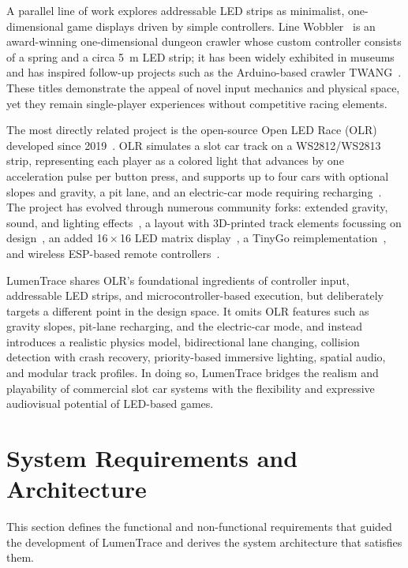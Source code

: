 \documentclass[10pt,journal,final,a4paper]{IEEEtran}
\begin{document}
A parallel line of work explores addressable LED strips as minimalist, one-dimensional game displays driven by simple controllers. Line Wobbler~\cite{baumgarten:2023line} is an award-winning one-dimensional dungeon crawler whose custom controller consists of a spring and a circa \SI{5}{\meter} LED strip; it has been widely exhibited in museums and has inspired follow-up projects such as the Arduino-based crawler TWANG~\cite{critters:2020twang}. These titles demonstrate the appeal of novel input mechanics and physical space, yet they remain single-player experiences without competitive racing elements. 

The most directly related project is the open-source Open LED Race (OLR) developed since 2019~\cite{pereira:2023applying}. OLR simulates a slot car track on a WS2812/WS2813 strip, representing each player as a colored light that advances by one acceleration pulse per button press, and supports up to four cars with optional slopes and gravity, a pit lane, and an electric-car mode requiring recharging~\cite{openledrace:2023article,openledrace:2025project}. The project has evolved through numerous community forks: extended gravity, sound, and lighting effects~\cite{arminjo:2025open}, a layout with 3D-printed track elements focussing on design~\cite{hackerspace:2024open}, an added 16\,$\times$\,16 LED matrix display~\cite{framboise:2024open}, a TinyGo reimplementation~\cite{esteban:2019ledrace}, and wireless ESP-based remote controllers~\cite{gmag11:2020ledrace}.

LumenTrace shares OLR's foundational ingredients of controller input, addressable LED strips, and microcontroller-based execution, but deliberately targets a different point in the design space. It omits OLR features such as gravity slopes, pit-lane recharging, and the electric-car mode, and instead introduces a realistic physics model, bidirectional lane changing, collision detection with crash recovery, priority-based immersive lighting, spatial audio, and modular track profiles. In doing so, LumenTrace bridges the realism and playability of commercial slot car systems with the flexibility and expressive audiovisual potential of LED-based games.

\section{System Requirements and Architecture}
\label{sec:system-requirements-and-architecture}

This section defines the functional and non-functional requirements that guided the development of LumenTrace and derives the system architecture that satisfies them.
\end{document}
